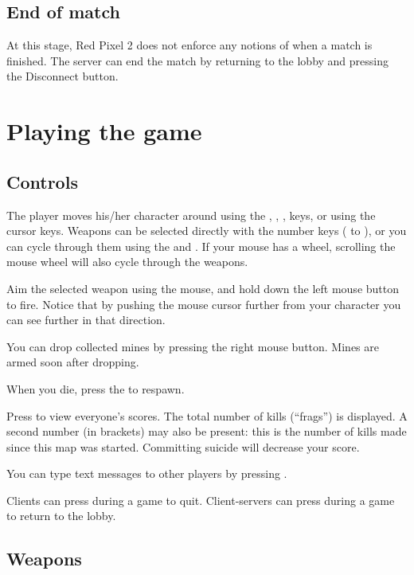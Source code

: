 \documentclass[a4paper,titlepage]{article}
\begin{document}
\subsection{End of match}

At this stage, Red Pixel 2 does not enforce any notions of when a
match is finished.  The server can end the match by returning to the
lobby and pressing the \textsf{Disconnect} button.



\section{Playing the game}


\subsection{Controls}

The player moves his/her character around using the , ,
,  keys, or using the cursor keys.  Weapons can be
selected directly with the number keys ( to ), or you
can cycle through them using the  and .  If your mouse
has a wheel, scrolling the mouse wheel will also cycle through the
weapons.

Aim the selected weapon using the mouse, and hold down the left mouse
button to fire.  Notice that by pushing the mouse cursor further from
your character you can see further in that direction.

You can drop collected mines by pressing the right mouse button.
Mines are armed soon after dropping.

When you die, press the  to respawn.

Press  to view everyone's scores.  The total number of kills
(``frags'') is displayed.  A second number (in brackets) may also be
present: this is the number of kills made since this map was started.
Committing suicide will decrease your score.

You can type text messages to other players by pressing .

Clients can press  during a game to quit.  Client-servers can
press  during a game to return to the lobby.


\subsection{Weapons}
\end{document}
